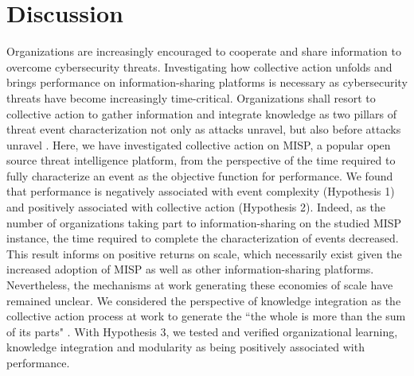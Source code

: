 \documentclass[unnumsec,webpdf,contemporary,large]{oup-authoring-template}%
\theoremstyle{thmstyleone}%
\theoremstyle{thmstyletwo}%
\theoremstyle{thmstylethree}%
\begin{document}
\section{Discussion}
\label{sec:discussion}
Organizations are increasingly encouraged to cooperate and share information to overcome cybersecurity threats. Investigating how collective action unfolds and brings performance on information-sharing platforms is necessary as cybersecurity threats have become increasingly time-critical. Organizations shall resort to collective action to gather information and integrate knowledge as two pillars of threat event characterization not only as attacks unravel, but also before attacks unravel \cite{wagner_cyber_2019}. Here, we have investigated collective action on MISP, a popular open source threat intelligence platform, from the perspective of the time required to fully characterize an event as the objective function for performance. We found that performance is negatively associated with event complexity (Hypothesis 1) and positively associated with collective action (Hypothesis 2). Indeed, as the number of organizations taking part to information-sharing on the studied MISP instance, the time required to complete the characterization of events decreased. This result informs on positive returns on scale, which necessarily exist given the increased adoption of MISP as well as other information-sharing platforms. Nevertheless, the mechanisms at work generating these economies of scale have remained unclear. We considered the perspective of knowledge integration \cite{tononi_consciousness_1998} as the collective action process at work to generate the ``the whole is more than the sum of its parts" \cite{sornette2014much}. With Hypothesis 3, we tested and verified organizational learning, knowledge integration and modularity as being positively associated with performance.\\
\end{document}
